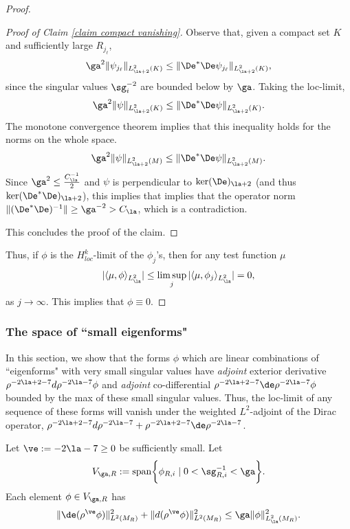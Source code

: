 \documentclass[hidelinks, 12pt, oneside, reqno]{amsart}
\begin{document}
\begin{proof}
\begin{proof}[Proof of Claim \ref{claim compact vanishing}]
    Observe that, given a compact set $K$ and sufficiently large $R_{j_\ell}$,
    \[
    \ga^2 \|\psi_{j_\ell}\|_{L^2_{\la+2}(K)} \le  \|\De^*\De \psi_{j_\ell}\|_{L^2_{\la+2}(K)},
    \]
    since the singular values $\sg_i^{-2}$ are bounded below by $\ga$. Taking the loc-limit,
    \[
    \ga^2 \| \psi \|_{L^2_{\la+2}(K)} \le  \|\De^*\De \psi \|_{L^2_{\la+2}(K)}.
    \]
    The monotone convergence theorem implies that this inequality holds for the norms on the whole space.
    \[
    \ga^2 \| \psi \|_{L^2_{\la+2}(M)} \le  \|\De^*\De \psi \|_{L^2_{\la+2}(M)}.
    \]
    Since $\ga^2 \le \frac{C_\la^{-1}}{2}$ and $\psi$ is perpendicular to $\ker(\De)_{\la+2}$ (and thus $\ker(\De^*\De)_{\la+2}$), this implies that implies that the operator norm $\|(\De^*\De)^{-1}\| \ge  \ga^{-2} > C_{\la}$,  which is a contradiction. 

    This concludes the proof of the claim.    
    \end{proof}
    
    Thus, if $\phi$ is the $H^k_{loc}$-limit of the $\phi_j$'s, then for any test function $\mu$
    \[
   |\langle \mu, \phi \rangle_{L^2_{\la}}| \le \limsup_j |\langle \mu, \phi_j \rangle_{L^2_{\la}}| = 0,
    \]
    as $j \rightarrow \infty$. This implies that $\phi \equiv 0$.
\end{proof}


\subsubsection{The space of ``small eigenforms"}
In this section, we show that the forms $\phi$ which are linear combinations of ``eigenforms" with very small singular values have \textit{adjoint} exterior derivative $\rho^{-2\la + 2 -7}d\rho^{-2\la -7}\phi$ and \textit{adjoint} co-differential $\rho^{-2\la + 2 -7}\de\rho^{-2\la -7} \phi$ bounded by the max of these small singular values. Thus, the loc-limit of any sequence of these forms will vanish under the weighted $L^2$-adjoint of the Dirac operator, $\rho^{-2\la + 2 -7}d\rho^{-2\la -7} + \rho^{-2\la + 2 -7}\de\rho^{-2\la -7} $.

\begin{lem}\label{lemma smallness of dirac}
    Let $\ve := -2\la -7 \ge 0$ be sufficiently small. Let
    \[
    V_{\ga,R} := \mathrm{span}\bigg\{\phi_{R,i}\;|\; 0 <  \sg_{R,i}^{-1}  < \ga  \bigg\}.
    \]
    Each element $\phi \in V_{\ga,R}$ has 
    \[
    \|\de (\rho^\ve \phi)\|_{L^2(M_R)}^2 + \|d (\rho^\ve \phi)\|_{L^2(M_R)}^2 \le \ga \|\phi\|^2_{L^2_{\la}(M_R)}.
    \]
\end{lem}
\end{document}
